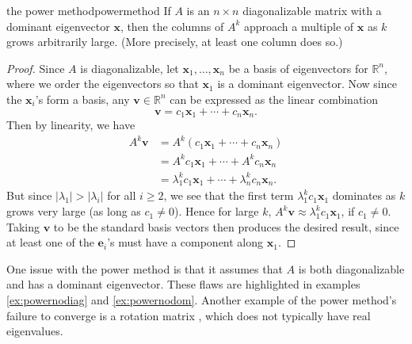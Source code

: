 \documentclass{article}
\let\vec\mathbf
\begin{document}
\begin{theorem}{the power method}{powermethod}
  If $A$ is an $n \times n$ diagonalizable matrix with a dominant eigenvector $\vec{x}$, then the columns of $A^k$ approach a multiple of $\vec{x}$ as $k$ grows arbitrarily large. (More precisely, at least one column does so.)
\end{theorem}
\begin{proof}
  Since $A$ is diagonalizable, let $\vec{x}_1, \ldots, \vec{x}_n$ be a basis of eigenvectors for $\mathbb{R}^n$, where we order the eigenvectors so that $\vec{x}_1$ is a dominant eigenvector. Now since the $\vec{x}_i$'s form a basis, any $\vec{v} \in \mathbb{R}^n$ can be expressed as the linear combination
  \begin{equation*}
    \vec{v} = c_1\vec{x}_1 + \cdots + c_n\vec{x}_n.
  \end{equation*}
  Then by linearity, we have
  \begin{align*}
    A^k\vec{v} &= A^k(c_1\vec{x}_1 + \cdots + c_n\vec{x}_n) \\
               &= A^kc_1\vec{x}_1 + \cdots + A^kc_n\vec{x}_n \\
               &= \lambda_1^kc_1\vec{x}_1 + \cdots + \lambda_n^kc_n\vec{x}_n.
  \end{align*}
  But since $|\lambda_1| > |\lambda_i|$ for all $i \geq 2$, we see that the first term $\lambda_1^kc_1\vec{x}_1$ dominates as $k$ grows very large (as long as $c_1 \neq 0$). Hence for large $k$, $A^k\vec{v} \approx \lambda_1^kc_1\vec{x}_1$, if $c_1 \neq 0$. Taking $\vec{v}$ to be the standard basis vectors then produces the desired result, since at least one of the $\vec{e}_i$'s must have a component along $\vec{x}_1$.
\end{proof}

One issue with the power method is that it assumes that $A$ is both diagonalizable and has a dominant eigenvector. These flaws are highlighted in examples \ref{ex:powernodiag} and \ref{ex:powernodom}. Another example of the power method's failure to converge is a rotation matrix \cite{pwr-rot}, which does not typically have real eigenvalues.
\end{document}
